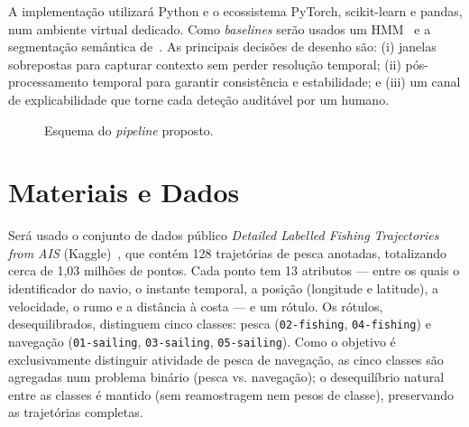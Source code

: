 \documentclass{article}
\begin{document}
A implementa\c{c}\~ao utilizar\'a Python e o ecossistema PyTorch, scikit-learn e pandas,
num ambiente virtual dedicado. Como
\emph{baselines} ser\~ao usados um HMM~\cite{peel2011} e a segmenta\c{c}\~ao sem\^antica
de~\cite{wu2022}. As principais decis\~oes de desenho s\~ao: (i) janelas sobrepostas para
capturar contexto sem perder resolu\c{c}\~ao temporal; (ii) p\'os-processamento temporal para
garantir consist\^encia e estabilidade; e (iii) um canal de explicabilidade que torne cada
dete\c{c}\~ao audit\'avel por um humano.

\begin{figure}[t]
\centering
{}
\caption{Esquema do \emph{pipeline} proposto.}
\label{fig:pipeline}
\end{figure}

\section{Materiais e Dados}
\label{sec:materiais-dados}

Ser\'a usado o conjunto de dados p\'ublico \emph{Detailed Labelled Fishing Trajectories
from AIS} (Kaggle)~\cite{kaggleAIS}, que cont\'em 128 trajet\'orias de pesca anotadas, totalizando cerca de
1,03 milh\~oes de pontos. Cada ponto tem 13 atributos --- entre os quais o identificador do navio, o instante
temporal, a posi\c{c}\~ao (longitude e latitude), a velocidade, o rumo e a dist\^ancia \`a
costa --- e um r\'otulo. Os r\'otulos,
desequilibrados, distinguem cinco classes: pesca (\texttt{02-fishing},
\texttt{04-fishing}) e navega\c{c}\~ao (\texttt{01-sailing}, \texttt{03-sailing},
\texttt{05-sailing}). Como o objetivo \'e exclusivamente distinguir atividade de pesca de
navega\c{c}\~ao, as cinco classes s\~ao agregadas num problema bin\'ario (pesca vs.
navega\c{c}\~ao); o desequil\'ibrio natural entre as classes \'e mantido (sem reamostragem
nem pesos de classe), preservando as trajet\'orias completas.
\end{document}
